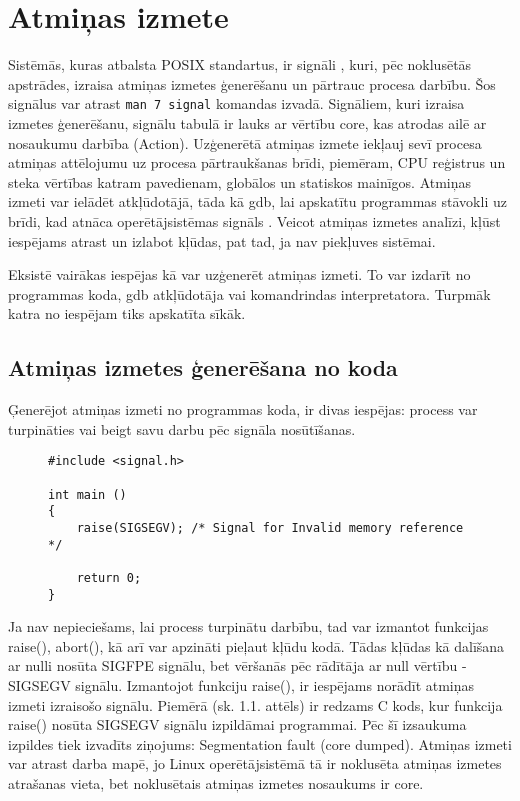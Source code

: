﻿%

\section{Atmiņas izmete}

Sistēmās, kuras atbalsta POSIX standartus, ir signāli \cite {USP}, kuri, pēc noklusētās apstrādes, izraisa atmiņas izmetes ģenerēšanu un pārtrauc procesa darbību. 
Šos signālus var atrast  \texttt{man 7 signal} komandas izvadā. 
Signāliem, kuri izraisa izmetes ģenerēšanu, signālu tabulā \cite{signal} ir lauks ar vērtību core, kas atrodas ailē ar nosaukumu darbība (Action). 
Uzģenerētā atmiņas izmete iekļauj sevī procesa atmiņas attēlojumu uz procesa pārtraukšanas brīdi, piemēram, CPU reģistrus un steka vērtības katram pavedienam, globālos un statiskos mainīgos. 
Atmiņas izmeti var ielādēt atkļūdotājā, tāda kā gdb, lai  apskatītu programmas stāvokli uz brīdi, kad atnāca operētājsistēmas signāls \cite {core}.
Veicot atmiņas izmetes analīzi, kļūst iespējams atrast un izlabot kļūdas, pat tad, ja nav piekļuves sistēmai. 


Eksistē vairākas iespējas kā var uzģenerēt atmiņas izmeti.  To var izdarīt no programmas koda,  gdb atkļūdotāja vai komandrindas interpretatora. 
Turpmāk katra no iespējam tiks apskatīta sīkāk.

\subsection{Atmiņas izmetes ģenerēšana no koda}

Ģenerējot atmiņas izmeti no programmas koda, ir divas iespējas: process var turpināties vai beigt savu darbu pēc signāla nosūtīšanas.

\begin{figure}[h]
\begin{lstlisting}
#include <signal.h>

int main ()  
{
    raise(SIGSEGV); /* Signal for Invalid memory reference */
	
    return 0;
}
\end{lstlisting}
\caption{\textbf{\fontsize{11}{12}\selectfont {Atmiņas izmetes ģenerēšana, pārtraucot procesa darbību}}}
\end{figure}

Ja nav nepieciešams, lai process turpinātu darbību, tad var izmantot funkcijas raise(), abort(), kā arī var apzināti pieļaut kļūdu kodā.
Tādas kļūdas kā dalīšana ar nulli nosūta SIGFPE signālu, bet vēršanās pēc rādītāja ar null vērtību - SIGSEGV signālu.
Izmantojot funkciju raise(), ir iespējams norādīt atmiņas izmeti izraisošo signālu.
Piemērā (sk. 1.1. attēls) ir redzams C kods, kur funkcija raise() nosūta SIGSEGV signālu izpildāmai programmai. 
Pēc šī izsaukuma izpildes tiek izvadīts ziņojums: Segmentation fault (core dumped).
Atmiņas izmeti var atrast darba mapē, jo Linux operētājsistēmā tā ir noklusēta atmiņas izmetes atrašanas vieta, bet noklusētais atmiņas izmetes nosaukums ir core.

